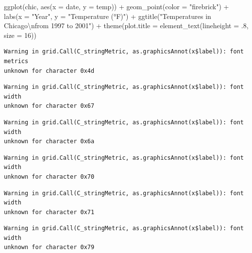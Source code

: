 \documentclass[
  letterpaper,
]{scrbook}
\newenvironment{Shaded}{\begin{snugshade}}{\end{snugshade}}
\newcommand{\AttributeTok}[1]{\textcolor[rgb]{0.40,0.45,0.13}{#1}}
\newcommand{\DecValTok}[1]{\textcolor[rgb]{0.68,0.00,0.00}{#1}}
\newcommand{\FunctionTok}[1]{\textcolor[rgb]{0.28,0.35,0.67}{#1}}
\newcommand{\NormalTok}[1]{\textcolor[rgb]{0.00,0.23,0.31}{#1}}
\newcommand{\SpecialCharTok}[1]{\textcolor[rgb]{0.37,0.37,0.37}{#1}}
\newcommand{\StringTok}[1]{\textcolor[rgb]{0.13,0.47,0.30}{#1}}
\begin{document}
\begin{Shaded}
\begin{Highlighting}[]
\FunctionTok{ggplot}\NormalTok{(chic, }\FunctionTok{aes}\NormalTok{(}\AttributeTok{x =}\NormalTok{ date, }\AttributeTok{y =}\NormalTok{ temp)) }\SpecialCharTok{+}
  \FunctionTok{geom\_point}\NormalTok{(}\AttributeTok{color =} \StringTok{"firebrick"}\NormalTok{) }\SpecialCharTok{+}
  \FunctionTok{labs}\NormalTok{(}\AttributeTok{x =} \StringTok{"Year"}\NormalTok{, }\AttributeTok{y =} \StringTok{"Temperature (°F)"}\NormalTok{) }\SpecialCharTok{+}
  \FunctionTok{ggtitle}\NormalTok{(}\StringTok{"Temperatures in Chicago}\SpecialCharTok{\textbackslash{}n}\StringTok{from 1997 to 2001"}\NormalTok{) }\SpecialCharTok{+}
  \FunctionTok{theme}\NormalTok{(}\AttributeTok{plot.title =} \FunctionTok{element\_text}\NormalTok{(}\AttributeTok{lineheight =}\NormalTok{ .}\DecValTok{8}\NormalTok{, }\AttributeTok{size =} \DecValTok{16}\NormalTok{))}
\end{Highlighting}
\end{Shaded}

\begin{verbatim}
Warning in grid.Call(C_stringMetric, as.graphicsAnnot(x$label)): font metrics
unknown for character 0x4d
\end{verbatim}

\begin{verbatim}
Warning in grid.Call(C_stringMetric, as.graphicsAnnot(x$label)): font width
unknown for character 0x67
\end{verbatim}

\begin{verbatim}
Warning in grid.Call(C_stringMetric, as.graphicsAnnot(x$label)): font width
unknown for character 0x6a
\end{verbatim}

\begin{verbatim}
Warning in grid.Call(C_stringMetric, as.graphicsAnnot(x$label)): font width
unknown for character 0x70
\end{verbatim}

\begin{verbatim}
Warning in grid.Call(C_stringMetric, as.graphicsAnnot(x$label)): font width
unknown for character 0x71
\end{verbatim}

\begin{verbatim}
Warning in grid.Call(C_stringMetric, as.graphicsAnnot(x$label)): font width
unknown for character 0x79
\end{verbatim}
\end{document}
